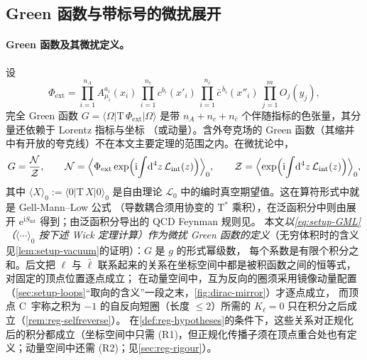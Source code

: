 \documentclass[UTF8,a4paper,11pt,fontset=fandol]{ctexart}
\theoremstyle{cplain}
\theoremstyle{cdefinition}
\theoremstyle{cremark}
\numberwithin{equation}{section}
\newcommand{\dd}{\mathrm{d}}                         %
\newcommand{\ii}{\mathrm{i}}                        %
\newcommand{\ee}{\mathrm{e}}                        %
\begin{document}
\subsection{Green 函数与带标号的微扰展开}\label{sec:setup-expansion}

\paragraph{Green 函数及其微扰定义。}
设
\begin{equation}\label{eq:setup-Phiext}
\Phi_{\mathrm{ext}}=\prod_{i=1}^{n_A}A^{a_i}_{\mu_i}(x_i)\,\prod_{i=1}^{n_c}c^{b_i}(x'_i)\,\prod_{i=1}^{n_{\bar c}}\bar c^{\,\bar b_i}(x''_i)\,\prod_{j=1}^{m}O_j(y_j),
\end{equation}
完全 Green 函数 $G=\langle\Omega|\mathrm T\,\Phi_{\mathrm{ext}}|\Omega\rangle$ 是带 $n_A+n_c+n_{\bar c}$ 个伴随指标的色张量，其分量还依赖于 Lorentz 指标与坐标
（或动量）。含外夸克场的 Green 函数（其缩并中有开放的夸克线）不在本文主要定理的范围之内。在微扰论中，
\begin{equation}\label{eq:setup-GML}
G=\frac{\mathcal N}{\mathcal Z},\qquad
\mathcal N=\Bigl\langle\Phi_{\mathrm{ext}}\exp\Bigl(\ii\!\int\!\dd^4z\,\mathcal L_{\mathrm{int}}(z)\Bigr)\Bigr\rangle_0,\qquad
\mathcal Z=\Bigl\langle\exp\Bigl(\ii\!\int\!\dd^4z\,\mathcal L_{\mathrm{int}}(z)\Bigr)\Bigr\rangle_0 ,
\end{equation}
其中 $\langle X\rangle_0:=\langle0|\mathrm T\,X|0\rangle_0$ 是自由理论 $\mathcal L_0$ 中的编时真空期望值。这在算符形式中就是 Gell-Mann--Low 公式
（导数耦合须用协变的 $\mathrm T^*$ 乘积），在泛函积分中则由展开 $\ee^{\ii S_{\mathrm{int}}}$ 得到；由泛函积分导出的 QCD Feynman 规则见\cite[第 16 章]{PeskinSchroeder1995}。
本文\emph{以\cref{eq:setup-GML}（$\langle\cdots\rangle_0$ 按下述 Wick 定理计算）作为微扰 Green 函数的定义}（无穷体积时的含义见\cref{lem:setup-vacuum}的证明）：$G$ 是 $g$ 的形式幂级数，
每个系数是有限个积分之和。后文把 $\ell$ 与 $\bar\ell$ 联系起来的关系在坐标空间中都是被积函数之间的恒等式，对固定的顶点位置逐点成立；
在动量空间中，互为反向的圈须采用镜像动量配置（\cref{sec:setup-loops}“取向的含义”一段之末，\cref{fig:dirac-mirror}）才逐点成立，
而顶点 C~宇称之积为 $-1$ 的自反向短圈（长度 $\le2$）所需的 $K_\ell=0$ 只在积分之后成立（\cref{rem:reg-selfreverse}）。
在\cref{def:reg-hypotheses}的条件下，这些关系对正规化后的积分都成立（坐标空间中只需 (R1)，但正规化传播子须在顶点重合处也有定义；动量空间中还需 (R2)；见\cref{sec:reg-rigour}）。
\end{document}
